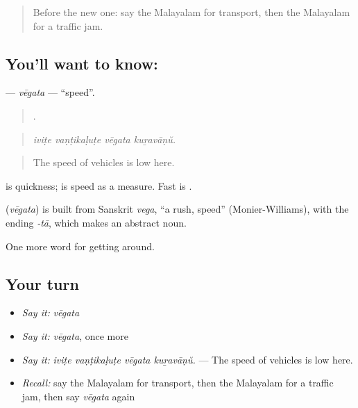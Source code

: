 \label{lesson:ML-C472-vegata}



\begin{quote}
Before the new one: say the Malayalam for transport, then the Malayalam for a traffic jam.
\end{quote}

\subsection*{You'll want to know: }
\textbf{} — \emph{vēgata} — \textquotedblleft{}speed\textquotedblright{}.

\begin{quote}
   .
\end{quote}

\begin{quote}
\emph{iviṭe vaṇṭikaḷuṭe vēgata kuṟavāṇŭ.}
\end{quote}

\begin{quote}
The speed of vehicles is low here.
\end{quote}

 is quickness;  is speed as a measure. Fast is .

\begin{cousinweb}
\textbf{} (\emph{vēgata}) is built from Sanskrit \emph{vega}, \textquotedblleft{}a rush, speed\textquotedblright{} (Monier-Williams), with the ending \emph{-tā}, which makes an abstract noun.
\end{cousinweb}

\begin{grammarlens}[title={What you've built}]
One more word for getting around.
\end{grammarlens}

\subsection*{Your turn}
\begin{itemize}
\raggedright
  \item \emph{Say it:} \emph{vēgata}
  \item \emph{Say it:} \emph{vēgata}, once more
  \item \emph{Say it:} \emph{iviṭe vaṇṭikaḷuṭe vēgata kuṟavāṇŭ.} — The speed of vehicles is low here.
  \item \emph{Recall:} say the Malayalam for transport, then the Malayalam for a traffic jam, then say \emph{vēgata} again
\end{itemize}


